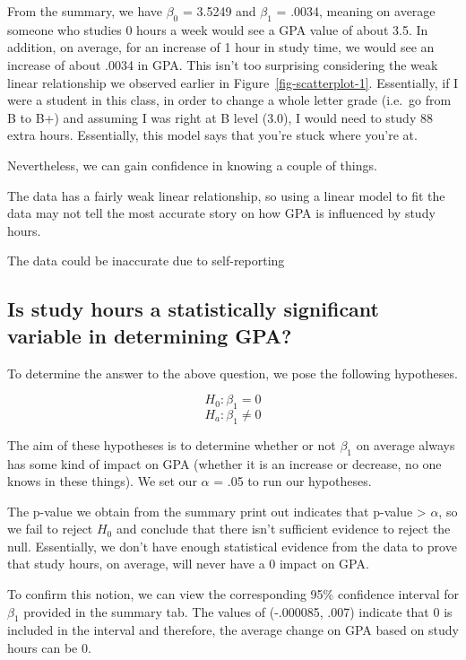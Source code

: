 \documentclass[
  letterpaper,
  DIV=11,
  numbers=noendperiod]{scrreprt}
\begin{document}
From the summary, we have \(\beta_0\) = 3.5249 and \(\beta_1\) = .0034,
meaning on average someone who studies 0 hours a week would see a GPA
value of about 3.5. In addition, on average, for an increase of 1 hour
in study time, we would see an increase of about .0034 in GPA. This
isn't too surprising considering the weak linear relationship we
observed earlier in Figure~\ref{fig-scatterplot-1}. Essentially, if I
were a student in this class, in order to change a whole letter grade
(i.e.~go from B to B+) and assuming I was right at B level (3.0), I
would need to study 88 extra hours. Essentially, this model says that
you're stuck where you're at.

Nevertheless, we can gain confidence in knowing a couple of things.

The data has a fairly weak linear relationship, so using a linear model
to fit the data may not tell the most accurate story on how GPA is
influenced by study hours.

The data could be inaccurate due to self-reporting

\hypertarget{is-study-hours-a-statistically-significant-variable-in-determining-gpa}{%
\subsection{Is study hours a statistically significant variable in
determining
GPA?}\label{is-study-hours-a-statistically-significant-variable-in-determining-gpa}}

To determine the answer to the above question, we pose the following
hypotheses.

\[
H_0: \beta_1 = 0
\] \[
H_a: \beta_1 \neq 0
\]

The aim of these hypotheses is to determine whether or not \(\beta_1\)
on average always has some kind of impact on GPA (whether it is an
increase or decrease, no one knows in these things). We set our
\(\alpha\) = .05 to run our hypotheses.

The p-value we obtain from the summary print out indicates that p-value
\textgreater{} \(\alpha\), so we fail to reject \(H_0\) and conclude
that there isn't sufficient evidence to reject the null. Essentially, we
don't have enough statistical evidence from the data to prove that study
hours, on average, will never have a 0 impact on GPA.

To confirm this notion, we can view the corresponding 95\% confidence
interval for \(\beta_1\) provided in the summary tab. The values of
(-.000085, .007) indicate that 0 is included in the interval and
therefore, the average change on GPA based on study hours can be 0.
\end{document}

